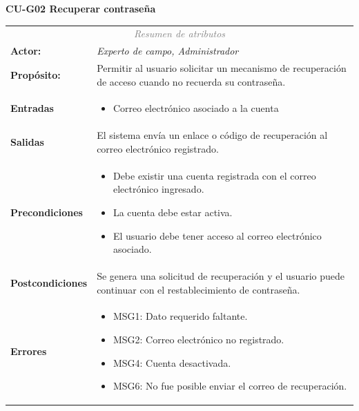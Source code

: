 \textbf{CU-G02 Recuperar contraseña}
\begin{table}[H]
\centering
\renewcommand{\arraystretch}{1.2}

\begin{tabular}{|l|p{10cm}|}
\hline
\rowcolor{black}
\multicolumn{2}{|l|}{\color{white} \textbf{Caso de uso:} CU-G02 Recuperar contraseña} \\ \hline

\multicolumn{2}{|c|}{\textit{\textcolor{gray}{Resumen de atributos}}} \\ \hline

\textbf{Actor:} & \textit{Experto de campo, Administrador} \\ \hline

\textbf{Propósito:} & Permitir al usuario solicitar un mecanismo de recuperación de acceso cuando no recuerda su contraseña. \\ \hline

\textbf{Entradas} & 
\begin{itemize}
    \item Correo electrónico asociado a la cuenta
\end{itemize} \\ \hline

\textbf{Salidas} & 
El sistema envía un enlace o código de recuperación al correo electrónico registrado. \\ \hline

\textbf{Precondiciones} & 
\begin{itemize}
    \item Debe existir una cuenta registrada con el correo electrónico ingresado.
    \item La cuenta debe estar activa.
    \item El usuario debe tener acceso al correo electrónico asociado.
\end{itemize} \\ \hline

\textbf{Postcondiciones} & 
Se genera una solicitud de recuperación y el usuario puede continuar con el restablecimiento de contraseña. \\ \hline

\textbf{Errores} & 
\begin{itemize}
    \item MSG1: Dato requerido faltante.
    \item MSG2: Correo electrónico no registrado.
    \item MSG4: Cuenta desactivada.
    \item MSG6: No fue posible enviar el correo de recuperación.
\end{itemize} \\ \hline


\end{tabular}
\end{table}
